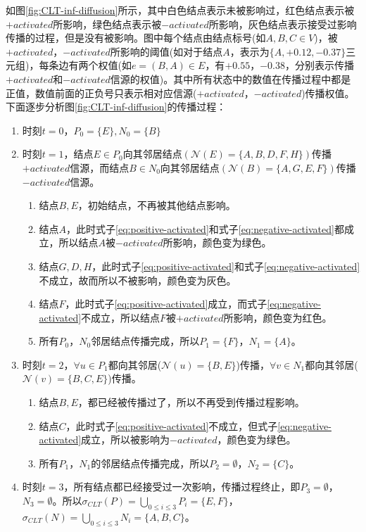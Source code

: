 如图\ref{fig:CLT-inf-diffusion}所示，其中白色结点表示未被影响过，红色结点表示被$+activated$所影响，绿色结点表示被$-activated$所影响，灰色结点表示接受过影响传播的过程，但是没有被影响。图中每个结点由结点标号(如$A, B, C \in V$)，被$+activated$，$-activated$所影响的阈值(如对于结点$A$，表示为$\{A, +0.12, -0.37\}$三元组)，每条边有两个权值(如$e = (B, A) \in E$，有$+0.55$，$-0.38$，分别表示传播$+activated$和$-activated$信源的权值)。其中所有状态中的数值在传播过程中都是正值，数值前面的正负号只表示相对应信源($+activated$，$-activated$)传播权值。下面逐步分析图\ref{fig:CLT-inf-diffusion}的传播过程：
\begin{enumerate}
\item 时刻$t=0$，$P_{0}=\{E\}, N_{0}=\{B\}$
\item 时刻$t=1$，结点$E \in P_{0}$向其邻居结点$(\mathcal{N}(E)=\{A, B, D, F, H\})$传播$+activated$信源，而结点$B \in N_{0}$向其邻居结点$(\mathcal{N}(B)=\{A, G, E, F\})$传播$-activated$信源。
	\begin{enumerate}
	\item 结点$B, E$，初始结点，不再被其他结点影响。
	\item 结点$A$，此时式子\ref{eq:positive-activated}和式子\ref{eq:negative-activated}都成立，所以结点$A$被$-activated$所影响，颜色变为绿色。
	\item 结点$G, D, H$，此时式子\ref{eq:positive-activated}和式子\ref{eq:negative-activated}不成立，故而所以不被影响，颜色变为灰色。
	\item 结点$F$，此时式子\ref{eq:positive-activated}成立，而式子\ref{eq:negative-activated}不成立，所以结点$F$被$+activated$所影响，颜色变为红色。
	\item 所有$P_{0}$，$N_{0}$邻居结点传播完成，所以$P_{1}=\{ F\}$，$N_{1}=\{A\}$。
	\end{enumerate}
\item 时刻$t=2$，$\forall u \in P_{1}$都向其邻居($\mathcal{N}(u)=\{B, E\}$)传播，$\forall v \in N_{1}$都向其邻居($\mathcal{N}(v)=\{B, C, E\}$)传播。
	\begin{enumerate}
	\item 结点$B, E$，都已经被传播过了，所以不再受到传播过程影响。
	\item 结点$C$，此时式子\ref{eq:positive-activated}不成立，但式子\ref{eq:negative-activated}成立，所以被影响为$-activated$，颜色变为绿色。
	\item 所有$P_{1}$，$N_{1}$的邻居结点传播完成，所以$P_{2}=\emptyset$，$N_{2}=\{C\}$。
	\end{enumerate}
\item 时刻$t=3$，所有结点都已经接受过一次影响，传播过程终止，即$P_{3}=\emptyset$，$N_{3}=\emptyset$。所以$\sigma_{CLT}(P)=\bigcup_{0 \leq i \leq 3}P_{i}=\{E, F\}$，$\sigma_{CLT}(N)=\bigcup_{0 \leq i \leq 3}N_{i}=\{A, B, C\}$。
\end{enumerate}


